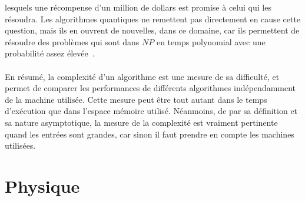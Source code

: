lesquels une récompense d'un million de dollars est promise à celui qui les résoudra.
Les algorithmes quantiques ne remettent pas directement en cause cette question, mais ils en ouvrent de nouvelles,
dans ce domaine, car ils permettent de résoudre des problèmes qui sont dans $NP$ en temps polynomial avec
une probabilité assez élevée~\cite{wiki:bqp}.\\ \\
En résumé, la complexité d'un algorithme est une mesure de sa difficulté, et permet de comparer les
performances de différents algorithmes indépendamment de la machine utilisée.
Cette mesure peut être tout autant dans le temps d'exécution que dans l'espace mémoire utilisé.
Néanmoins, de par sa définition et sa nature asymptotique, la mesure de la complexité est vraiment
pertinente quand les entrées sont grandes, car sinon il faut prendre en compte les machines utilisées.

\section{Physique}\label{sec:physique}


